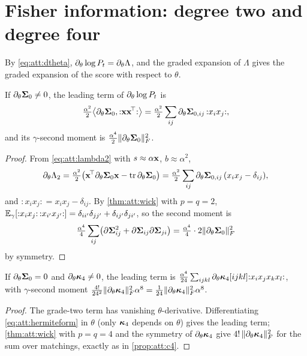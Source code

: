 \section{Fisher information: degree two and degree four}
\label{sec:att:information}

By \cref{eq:att:dtheta}, $\partial_\theta\log P_t=\partial_\theta\Lambda$, and the graded
expansion of $\Lambda$ gives the graded expansion of the score with respect to
$\theta$.

\begin{proposition}
\label{prop:att:info2}
If $\partial_\theta\mathbf{\Sigma}_0\ne0$, the leading term of $\partial_\theta\log P_t$ is
\[
  \tfrac{\alpha^2}2\bigl\langle\partial_\theta\mathbf{\Sigma}_0,{:}\mathbf{x}\mathbf{x}^{\!\top}{:}\bigr\rangle=\tfrac{\alpha^2}2\sum_{ij}\partial_\theta\mathbf{\Sigma}_{0,ij}\,{:}x_ix_j{:},
\]
and its $\gamma$-second moment is $\tfrac{\alpha^4}2\lVert \partial_\theta\mathbf{\Sigma}_0 \rVert_{F}^2$.
\end{proposition}

\begin{proof}
From \cref{eq:att:lambda2} with $s\approx\alpha\mathbf{x}$, $b\approx\alpha^2$,
\[
  \partial_\theta\Lambda_2=\tfrac{\alpha^2}2\bigl(\mathbf{x}^{\!\top}\partial_\theta\mathbf{\Sigma}_0\mathbf{x}-\operatorname{tr}\partial_\theta\mathbf{\Sigma}_0\bigr)=\tfrac{\alpha^2}2\sum_{ij}\partial_\theta\mathbf{\Sigma}_{0,ij}\,(x_ix_j-\delta_{ij}),
\]
and ${:}x_ix_j{:}=x_ix_j-\delta_{ij}$. By \cref{thm:att:wick} with $p=q=2$,
$\mathbb{E}_\gamma[{:}x_ix_j{:}\,{:}x_{i'}x_{j'}{:}]=\delta_{ii'}\delta_{jj'}+\delta_{ij'}\delta_{ji'}$,
so the second moment is
\[
  \tfrac{\alpha^4}4\sum_{ij}\bigl(\partial\mathbf{\Sigma}_{ij}^2+\partial\mathbf{\Sigma}_{ij}\partial\mathbf{\Sigma}_{ji}\bigr)=\tfrac{\alpha^4}4\cdot2\lVert \partial_\theta\mathbf{\Sigma}_0 \rVert_{F}^2
\]
by symmetry.
\end{proof}

\begin{proposition}
\label{prop:att:info4}
If $\partial_\theta\mathbf{\Sigma}_0=0$ and $\partial_\theta\bm{\kappa}_4\ne0$, the leading term is
$\tfrac{\alpha^4}{24}\sum_{ijkl}\partial_\theta\bm{\kappa}_4[ijkl]{:}x_ix_jx_kx_l{:}$, with
$\gamma$-second moment $\tfrac{4!}{24^2}\lVert \partial_\theta\bm{\kappa}_4 \rVert_{F}^2\alpha^8=\tfrac1{24}\lVert \partial_\theta\bm{\kappa}_4 \rVert_{F}^2\alpha^8$.
\end{proposition}

\begin{proof}
The grade-two term has vanishing $\theta$-derivative. Differentiating
\cref{eq:att:hermiteform} in $\theta$ (only $\bm{\kappa}_4$ depends on $\theta$) gives the
leading term; \cref{thm:att:wick} with $p=q=4$ and the symmetry of
$\partial_\theta\bm{\kappa}_4$ give $4!\,\lVert \partial_\theta\bm{\kappa}_4 \rVert_{F}^2$ for the sum over
matchings, exactly as in \cref{prop:att:c4}.
\end{proof}

